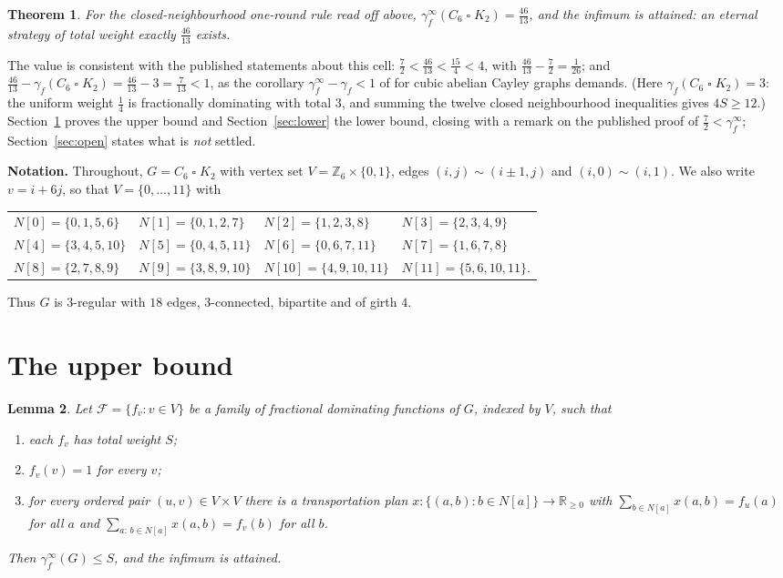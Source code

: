 \documentclass[11pt]{amsart}
\newtheorem{theorem}{Theorem}
\newtheorem{lemma}[theorem]{Lemma}
\theoremstyle{remark}
\newcommand{\fed}{\gamma_f^{\infty}}
\newcommand{\Z}{\mathbb{Z}}
\begin{document}
\begin{theorem}\label{thm:main}
For the closed-neighbourhood one-round rule read off above,
$\displaystyle \fed(C_6\mathbin{\square}K_2)=\frac{46}{13}$, and the infimum is
attained: an eternal strategy of total weight exactly $\tfrac{46}{13}$ exists.
\end{theorem}

The value is consistent with the published statements about this cell:
$\tfrac72<\tfrac{46}{13}<\tfrac{15}{4}<4$, with
$\tfrac{46}{13}-\tfrac72=\tfrac1{26}$; and
$\tfrac{46}{13}-\gamma_f(C_6\mathbin{\square}K_2)=\tfrac{46}{13}-3=\tfrac7{13}<1$,
as the corollary $\fed-\gamma_f<1$ of \cite{FED} for cubic abelian Cayley
graphs demands. (Here $\gamma_f(C_6\mathbin{\square}K_2)=3$: the uniform weight
$\tfrac14$ is fractionally dominating with total $3$, and summing the twelve
closed neighbourhood inequalities gives $4S\ge12$.)
Section~\ref{sec:upper} proves the upper bound and Section~\ref{sec:lower} the
lower bound, closing with a remark on the published proof of
$\tfrac72<\fed$; Section~\ref{sec:open} states what is \emph{not} settled.

\medskip
\noindent\textbf{Notation.} Throughout, $G=C_6\mathbin{\square}K_2$ with vertex
set $V=\Z_6\times\{0,1\}$, edges $(i,j)\sim(i\pm1,j)$ and $(i,0)\sim(i,1)$.
We also write $v=i+6j$, so that $V=\{0,\dots,11\}$ with
\begin{center}\footnotesize
\begin{tabular}{llll}
$N[0]=\{0,1,5,6\}$   & $N[1]=\{0,1,2,7\}$   & $N[2]=\{1,2,3,8\}$    & $N[3]=\{2,3,4,9\}$\\
$N[4]=\{3,4,5,10\}$  & $N[5]=\{0,4,5,11\}$  & $N[6]=\{0,6,7,11\}$   & $N[7]=\{1,6,7,8\}$\\
$N[8]=\{2,7,8,9\}$   & $N[9]=\{3,8,9,10\}$  & $N[10]=\{4,9,10,11\}$ & $N[11]=\{5,6,10,11\}$.
\end{tabular}
\end{center}
Thus $G$ is $3$-regular with $18$ edges, $3$-connected, bipartite and of girth
$4$.

\section{The upper bound}\label{sec:upper}

\begin{lemma}\label{lem:frame}
Let $\mathcal F=\{f_v : v\in V\}$ be a family of fractional dominating
functions of $G$, indexed by $V$, such that
\begin{enumerate}
\item[(i)] each $f_v$ has total weight $S$;
\item[(ii)] $f_v(v)=1$ for every $v$;
\item[(iii)] for every ordered pair $(u,v)\in V\times V$ there is a
  transportation plan $x\colon\{(a,b):b\in N[a]\}\to\mathbb{R}_{\ge0}$ with
  $\sum_{b\in N[a]}x(a,b)=f_u(a)$ for all $a$ and
  $\sum_{a:\,b\in N[a]}x(a,b)=f_v(b)$ for all $b$.
\end{enumerate}
Then $\fed(G)\le S$, and the infimum is attained.
\end{lemma}
\end{document}
